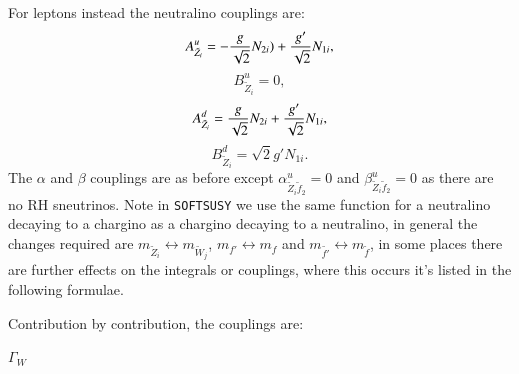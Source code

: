 \documentclass[final,3p,times,pdflatex]{elsarticle}
\begin{document}
For leptons instead the neutralino couplings are:
\begin{equation}
A_{\tilde{Z}_i}^{u} = -{g \over \sqrt{2}}N_{2i}) + {g' \over \sqrt{2}}N_{1i},
\end{equation}
\begin{equation}
B_{\tilde{Z}_i}^{u} = 0,
\end{equation}
\begin{equation}
A_{\tilde{Z}_{i}}^{d} = {g \over \sqrt{2}}N_{2i} + {g' \over \sqrt{2}}N_{1i},
\end{equation}
\begin{equation}
B_{\tilde{Z}_{i}}^{d} = \sqrt{2} g' N_{1i}.
\end{equation}
The $\alpha$ and $\beta$ couplings are as before except $\alpha_{\tilde{Z}_{i} \tilde{f}_2}^{u} = 0$ and $\beta_{\tilde{Z}_{i} \tilde{f}_2}^{u} = 0$ as there are no RH sneutrinos.
Note in {\tt {\tt SOFTSUSY}} we use the same function for a neutralino decaying to a chargino as a chargino decaying to a neutralino, in general the changes required are $m_{\tilde{Z}_i} \leftrightarrow m_{\tilde{W}_j}$, $m_{f'} \leftrightarrow m_{f}$ and $m_{\tilde{f'}} \leftrightarrow m_{\tilde{f}}$, in some places there are further effects on the integrals or couplings, where this occurs it's listed in the following formulae.

Contribution by contribution, the couplings are:

\textbf{\underline{$\Gamma_{W}$}}
\end{document}
